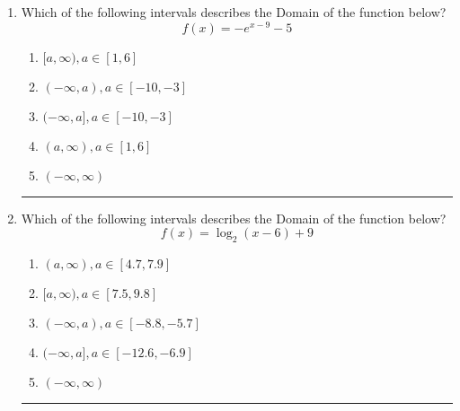 \documentclass[14pt]{extbook}
\newcommand{\litem}[1]{\item#1\hspace*{-1cm}\rule{\textwidth}{0.4pt}}
\begin{document}
\begin{enumerate}
{\begin{enumerate}[label=\Alph*.]
\end{enumerate} }
\litem{
Which of the following intervals describes the Domain of the function below?\[ f(x) = -e^{x-9}-5 \]\begin{enumerate}[label=\Alph*.]
\item \( [a, \infty), a \in [1, 6] \)
\item \( (-\infty, a), a \in [-10, -3] \)
\item \( (-\infty, a], a \in [-10, -3] \)
\item \( (a, \infty), a \in [1, 6] \)
\item \( (-\infty, \infty) \)

\end{enumerate} }
\litem{
Which of the following intervals describes the Domain of the function below?\[ f(x) = \log_2{(x-6)}+9 \]\begin{enumerate}[label=\Alph*.]
\item \( (a, \infty), a \in [4.7, 7.9] \)
\item \( [a, \infty), a \in [7.5, 9.8] \)
\item \( (-\infty, a), a \in [-8.8, -5.7] \)
\item \( (-\infty, a], a \in [-12.6, -6.9] \)
\item \( (-\infty, \infty) \)

\end{enumerate} }
\end{enumerate}
\end{document}
